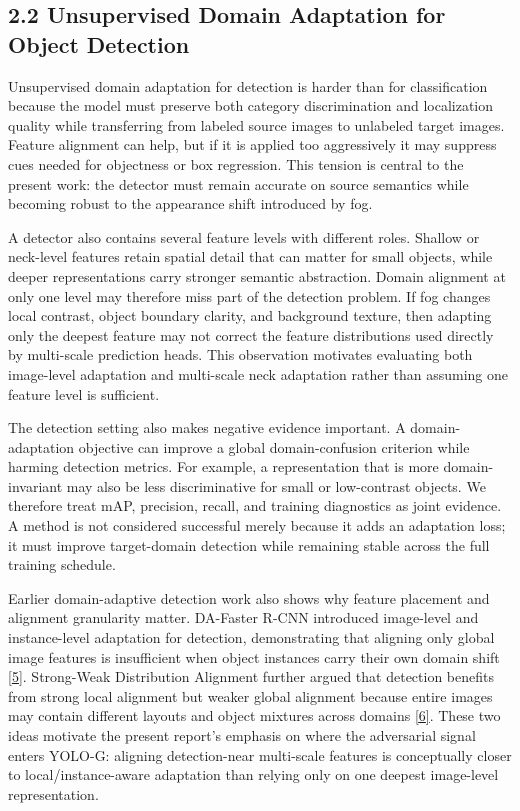 \documentclass[
  11pt,
]{article}
\begin{document}
\hypertarget{unsupervised-domain-adaptation-for-object-detection}{%
\subsection{2.2 Unsupervised Domain Adaptation for Object
Detection}\label{unsupervised-domain-adaptation-for-object-detection}}

Unsupervised domain adaptation for detection is harder than for
classification because the model must preserve both category
discrimination and localization quality while transferring from labeled
source images to unlabeled target images. Feature alignment can help,
but if it is applied too aggressively it may suppress cues needed for
objectness or box regression. This tension is central to the present
work: the detector must remain accurate on source semantics while
becoming robust to the appearance shift introduced by fog.

A detector also contains several feature levels with different roles.
Shallow or neck-level features retain spatial detail that can matter for
small objects, while deeper representations carry stronger semantic
abstraction. Domain alignment at only one level may therefore miss part
of the detection problem. If fog changes local contrast, object boundary
clarity, and background texture, then adapting only the deepest feature
may not correct the feature distributions used directly by multi-scale
prediction heads. This observation motivates evaluating both image-level
adaptation and multi-scale neck adaptation rather than assuming one
feature level is sufficient.

The detection setting also makes negative evidence important. A
domain-adaptation objective can improve a global domain-confusion
criterion while harming detection metrics. For example, a representation
that is more domain-invariant may also be less discriminative for small
or low-contrast objects. We therefore treat mAP, precision, recall, and
training diagnostics as joint evidence. A method is not considered
successful merely because it adds an adaptation loss; it must improve
target-domain detection while remaining stable across the full training
schedule.

Earlier domain-adaptive detection work also shows why feature placement
and alignment granularity matter. DA-Faster R-CNN introduced image-level
and instance-level adaptation for detection, demonstrating that aligning
only global image features is insufficient when object instances carry
their own domain shift
\protect\hyperlink{ref-chen2018dafaster}{{[}5{]}}. Strong-Weak
Distribution Alignment further argued that detection benefits from
strong local alignment but weaker global alignment because entire images
may contain different layouts and object mixtures across domains
\protect\hyperlink{ref-saito2019swda}{{[}6{]}}. These two ideas motivate
the present report's emphasis on where the adversarial signal enters
YOLO-G: aligning detection-near multi-scale features is conceptually
closer to local/instance-aware adaptation than relying only on one
deepest image-level representation.
\end{document}
